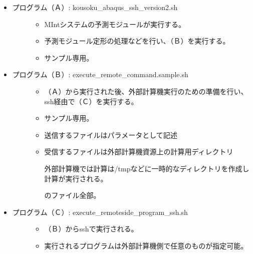 \documentclass[letterpaper,10pt,dvipdfmx,openany]{sphinxmanual}
\begin{document}
\begin{itemize}
\item {} \begin{description}
\item[{プログラム（Ａ）: kousoku\_abaqus\_ssh\_version2.sh}] \leavevmode\begin{itemize}
\item {} 
MIntシステムの予測モジュールが実行する。

\item {} 
予測モジュール定形の処理などを行い、（Ｂ）を実行する。

\item {} 
サンプル専用。

\end{itemize}

\end{description}

\item {} \begin{description}
\item[{プログラム（Ｂ）: execute\_remote\_command.sample.sh}] \leavevmode\begin{itemize}
\item {} 
（Ａ）から実行された後、外部計算機実行のための準備を行い、ssh経由で（Ｃ）を実行する。

\item {} 
サンプル専用。

\item {} 
送信するファイルはパラメータとして記述

\item {} 
受信するファイルは外部計算機資源上の計算用ディレクトリ %
\begin{footnote}[1]\sphinxAtStartFootnote
外部計算機では計算は/tmpなどに一時的なディレクトリを作成し計算が実行される。
%
\end{footnote} のファイル全部。

\end{itemize}

\end{description}

\item {} \begin{description}
\item[{プログラム（Ｃ）: execute\_remote\sphinxhyphen{}side\_program\_ssh.sh}] \leavevmode\begin{itemize}
\item {} 
（Ｂ）からsshで実行される。

\item {} 
実行されるプログラムは外部計算機側で任意のものが指定可能。


\end{itemize}
\end{description}
\end{itemize}
\end{document}
